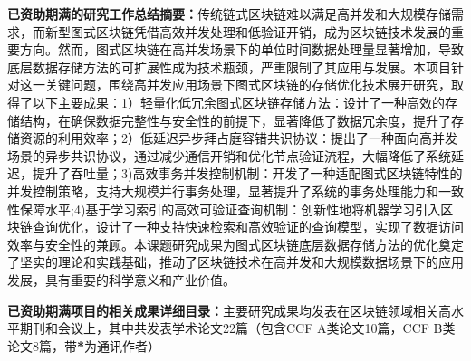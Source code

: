     \textbf{已资助期满的研究工作总结摘要：}传统链式区块链难以满足高并发和大规模存储需求，而新型图式区块链凭借高效并发处理和低验证开销，成为区块链技术发展的重要方向。然而，图式区块链在高并发场景下的单位时间数据处理量显著增加，导致底层数据存储方法的可扩展性成为技术瓶颈，严重限制了其应用与发展。本项目针对这一关键问题，围绕高并发应用场景下图式区块链的存储优化技术展开研究，取得了以下主要成果：1）轻量化低冗余图式区块链存储方法：设计了一种高效的存储结构，在确保数据完整性与安全性的前提下，显著降低了数据冗余度，提升了存储资源的利用效率；2）低延迟异步拜占庭容错共识协议：提出了一种面向高并发场景的异步共识协议，通过减少通信开销和优化节点验证流程，大幅降低了系统延迟，提升了吞吐量；3)高效事务并发控制机制：开发了一种适配图式区块链特性的并发控制策略，支持大规模并行事务处理，显著提升了系统的事务处理能力和一致性保障水平;4)基于学习索引的高效可验证查询机制：创新性地将机器学习引入区块链查询优化，设计了一种支持快速检索和高效验证的查询模型，实现了数据访问效率与安全性的兼顾。本课题研究成果为图式区块链底层数据存储方法的优化奠定了坚实的理论和实践基础，推动了区块链技术在高并发和大规模数据场景下的应用发展，具有重要的科学意义和产业价值。

\textbf{已资助期满项目的相关成果详细目录：}主要研究成果均发表在区块链领域相关高水平期刊和会议上，其中共发表学术论文22篇（包含CCF A类论文10篇，CCF B类论文8篇，带\textbf{*}为通讯作者）

